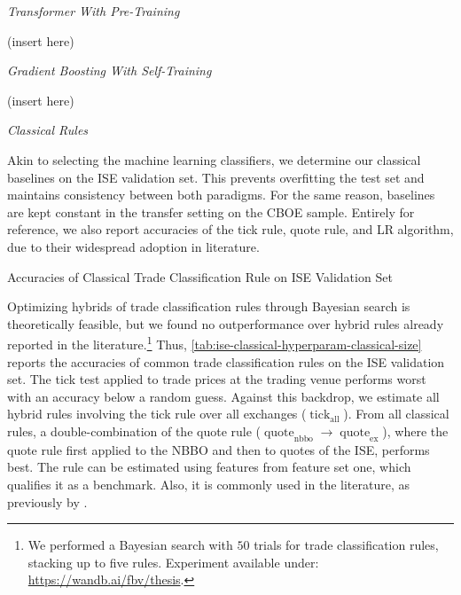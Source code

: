 \emph{Transformer With Pre-Training}

(insert here)

\emph{Gradient Boosting With Self-Training}

(insert here)

\emph{Classical Rules}

Akin to selecting the machine learning classifiers, we determine our classical baselines on the \gls{ISE} validation set. This prevents \gls{overfitting} the test set and maintains consistency between both paradigms. For the same reason, baselines are kept constant in the transfer setting on the \gls{CBOE} sample. Entirely for reference, we also report accuracies of the tick rule, quote rule, and \gls{LR} algorithm, due to their widespread adoption in literature.

\begin{table}[H]
    \centering
    \caption[Accuracies of Classical Trade Classification Rule on  Validation Set]{Accuracies of Classical Trade Classification Rule on \gls{ISE} Validation Set}
    \label{tab:ise-classical-hyperparam-classical-size}
    
\end{table}

Optimizing hybrids of trade classification rules through Bayesian search is theoretically feasible, but we found no outperformance over hybrid rules already reported in the literature.\footnote{We performed a Bayesian search with $50$ trials for trade classification rules, stacking up to five rules. Experiment available under: \url{https://wandb.ai/fbv/thesis}.} Thus, \cref{tab:ise-classical-hyperparam-classical-size} reports the accuracies of common trade classification rules on the \gls{ISE} validation set. The tick test applied to trade prices at the trading venue performs worst with an accuracy below a random guess. Against this backdrop, we estimate all hybrid rules involving the tick rule over all exchanges ($\operatorname{tick}_{\mathrm{all}}$). From all classical rules, a double-combination of the quote rule ($\operatorname{quote}_{\mathrm{nbbo}} \to \operatorname{quote}_{\mathrm{ex}}$), where the quote rule first applied to the \gls{NBBO} and then to quotes of the \gls{ISE}, performs best. The rule can be estimated using features from feature set one, which qualifies it as a benchmark. Also, it is commonly used in the literature, as previously by \textcite[][]{muravyevOptionsTradingCosts2020}.


